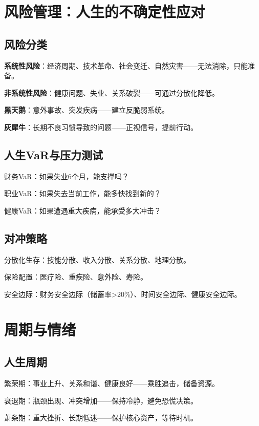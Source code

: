 \documentclass[12pt,a4paper]{article}
\begin{document}
\section{风险管理：人生的不确定性应对}

\subsection{风险分类}

\textbf{系统性风险}：经济周期、技术革命、社会变迁、自然灾害——无法消除，只能准备。

\textbf{非系统性风险}：健康问题、失业、关系破裂——可通过分散化降低。

\textbf{黑天鹅}：意外事故、突发疾病——建立反脆弱系统。

\textbf{灰犀牛}：长期不良习惯导致的问题——正视信号，提前行动。

\subsection{人生VaR与压力测试}

财务VaR：如果失业6个月，能支撑吗？

职业VaR：如果失去当前工作，能多快找到新的？

健康VaR：如果遭遇重大疾病，能承受多大冲击？

\subsection{对冲策略}

分散化生存：技能分散、收入分散、关系分散、地理分散。

保险配置：医疗险、重疾险、意外险、寿险。

安全边际：财务安全边际（储蓄率>20\%）、时间安全边际、健康安全边际。

\section{周期与情绪}

\subsection{人生周期}

繁荣期：事业上升、关系和谐、健康良好——乘胜追击，储备资源。

衰退期：瓶颈出现、冲突增加——保持冷静，避免恐慌决策。

萧条期：重大挫折、长期低迷——保护核心资产，等待时机。
\end{document}
